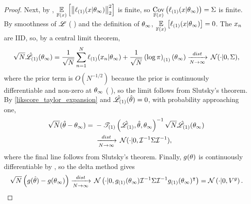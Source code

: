 \begin{proof}
Next, by  ,
$\underset{\mathbb{F}(x)}{\mathbb{E}}\left[\left\Vert \ell_{(1)}(x \vert \theta_{\infty})\right\Vert^2_2\right]$ is finite,
so $\underset{\mathbb{F}(x)}{\mathrm{Cov}}\left(\ell_{(1)}(x \vert
\theta_{\infty})\right) = \Sigma$ is finite. By smoothness of $\mathscr{L}$
( ) and the definition of
$\theta_{\infty}$, $\underset{\mathbb{F}(x)}{\mathbb{E}}\left[\ell_{(1)}(x \vert \theta_{\infty})\right] = 0$. The
$x_n$ are IID, so, by a central limit theorem,
%
\begin{align*}
%
\sqrt{N} \likhatk{1}(\thetatrue) =
    \frac{1}{\sqrt{N}} \sumn \ellgrad{1}(\x_n \vert \thetatrue) +
    \frac{1}{\sqrt{N}} \logpriorgrad{1}(\thetatrue)
\dlim \normdist(\cdot | 0, \scorecov),
%
\end{align*}
%
where the prior term is $O(N^{-1/2})$ because the prior is continuously
differentiable and non-zero at $\theta_{\infty}$ (
), so the limit follows from Slutsky's theorem.
By \eqref{likscore_taylor_expansion} and $\hat{\mathscr{L}}_{(1)}(\hat\theta) = 0$,
with probability approaching one,
%
\begin{align*}
%
\sqrt{N}(\thetahat - \thetatrue) ={}&
    -\tresid{1}{\likhatk{1}, \thetahat, \thetatrue}^{-1}
        \sqrt{N} \likhatk{1}(\thetatrue) \\
&\dlim \normdist(\cdot | 0, \info^{-1} \scorecov \info^{-1}),
%
\end{align*}
%
where the final line follows from Slutsky's theorem.  Finally, $g(\theta)$ is
continuously differentiable by , so the delta method
\citep[Theorem 3.1]{van:2000:asymptotic} gives
%
\begin{align*}
%
\sqrt{N}\left(\g(\thetahat) - \g(\thetatrue)\right) \dlim
    \normdist\left(\cdot | 0,
        \ggrad{1}(\thetatrue) \info^{-1} \scorecov \info^{-1}
        \ggrad{1}(\thetatrue)^\trans\right)
    = \normdist\left(\cdot | 0, \gcovtrue \right).
%
\end{align*}
%
\end{proof}
